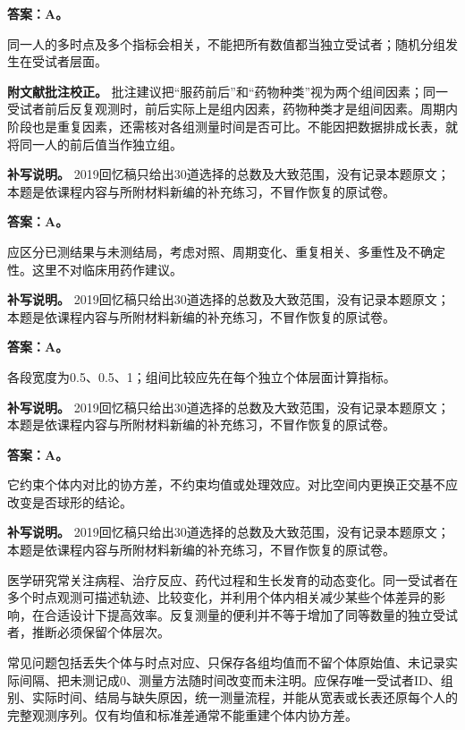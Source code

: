 \textbf{答案：A。}

同一人的多时点及多个指标会相关，不能把所有数值都当独立受试者；随机分组发生在受试者层面。

\textbf{附文献批注校正。} 批注建议把``服药前后''和``药物种类''视为两个组间因素；同一受试者前后反复观测时，前后实际上是组内因素，药物种类才是组间因素。周期内阶段也是重复因素，还需核对各组测量时间是否可比。不能因把数据排成长表，就将同一人的前后值当作独立组。


\textbf{补写说明。} 2019回忆稿只给出30道选择的总数及大致范围，没有记录本题原文；本题是依课程内容与所附材料新编的补充练习，不冒作恢复的原试卷。



\textbf{答案：A。}

应区分已测结果与未测结局，考虑对照、周期变化、重复相关、多重性及不确定性。这里不对临床用药作建议。


\textbf{补写说明。} 2019回忆稿只给出30道选择的总数及大致范围，没有记录本题原文；本题是依课程内容与所附材料新编的补充练习，不冒作恢复的原试卷。



\textbf{答案：A。}

各段宽度为0.5、0.5、1；组间比较应先在每个独立个体层面计算指标。


\textbf{补写说明。} 2019回忆稿只给出30道选择的总数及大致范围，没有记录本题原文；本题是依课程内容与所附材料新编的补充练习，不冒作恢复的原试卷。



\textbf{答案：A。}

它约束个体内对比的协方差，不约束均值或处理效应。对比空间内更换正交基不应改变是否球形的结论。


\textbf{补写说明。} 2019回忆稿只给出30道选择的总数及大致范围，没有记录本题原文；本题是依课程内容与所附材料新编的补充练习，不冒作恢复的原试卷。



医学研究常关注病程、治疗反应、药代过程和生长发育的动态变化。同一受试者在多个时点观测可描述轨迹、比较变化，并利用个体内相关减少某些个体差异的影响，在合适设计下提高效率。反复测量的便利并不等于增加了同等数量的独立受试者，推断必须保留个体层次。



常见问题包括丢失个体与时点对应、只保存各组均值而不留个体原始值、未记录实际间隔、把未测记成0、测量方法随时间改变而未注明。应保存唯一受试者ID、组别、实际时间、结局与缺失原因，统一测量流程，并能从宽表或长表还原每个人的完整观测序列。仅有均值和标准差通常不能重建个体内协方差。


